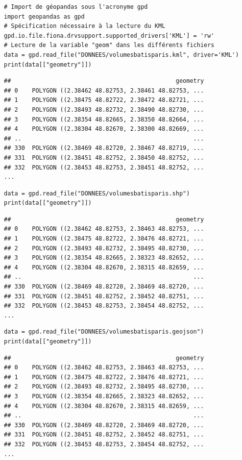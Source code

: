 \documentclass[
  11pt,
  french,
]{article}
\begin{document}
\begin{tcolorbox}[title= Formats KML\, GeoJSON et ShapeFile ,colback=boitecode]
\begin{lstlisting}[style=code]
# Import de géopandas sous l'acronyme gpd
import geopandas as gpd
# Spécification nécessaire à la lecture du KML
gpd.io.file.fiona.drvsupport.supported_drivers['KML'] = 'rw'
# Lecture de la variable "geom" dans les différents fichiers
data = gpd.read_file("DONNEES/volumesbatisparis.kml", driver='KML')
print(data[["geometry"]])\end{lstlisting}
\begin{lstlisting}[style=out]
##                                               geometry
## 0    POLYGON ((2.38462 48.82753, 2.38461 48.82753, ...
## 1    POLYGON ((2.38475 48.82722, 2.38472 48.82721, ...
## 2    POLYGON ((2.38493 48.82732, 2.38490 48.82730, ...
## 3    POLYGON ((2.38354 48.82665, 2.38350 48.82664, ...
## 4    POLYGON ((2.38304 48.82670, 2.38300 48.82669, ...
## ..                                                 ...
## 330  POLYGON ((2.38469 48.82720, 2.38467 48.82719, ...
## 331  POLYGON ((2.38451 48.82752, 2.38450 48.82752, ...
## 332  POLYGON ((2.38453 48.82753, 2.38451 48.82752, ...
...
\end{lstlisting}
\begin{lstlisting}[style=code]
data = gpd.read_file("DONNEES/volumesbatisparis.shp")
print(data[["geometry"]])\end{lstlisting}
\begin{lstlisting}[style=out]
##                                               geometry
## 0    POLYGON ((2.38462 48.82753, 2.38463 48.82753, ...
## 1    POLYGON ((2.38475 48.82722, 2.38476 48.82721, ...
## 2    POLYGON ((2.38493 48.82732, 2.38495 48.82730, ...
## 3    POLYGON ((2.38354 48.82665, 2.38323 48.82652, ...
## 4    POLYGON ((2.38304 48.82670, 2.38315 48.82659, ...
## ..                                                 ...
## 330  POLYGON ((2.38469 48.82720, 2.38469 48.82720, ...
## 331  POLYGON ((2.38451 48.82752, 2.38452 48.82751, ...
## 332  POLYGON ((2.38453 48.82753, 2.38454 48.82752, ...
...
\end{lstlisting}
\begin{lstlisting}[style=code]
data = gpd.read_file("DONNEES/volumesbatisparis.geojson")
print(data[["geometry"]])\end{lstlisting}
\begin{lstlisting}[style=out]
##                                               geometry
## 0    POLYGON ((2.38462 48.82753, 2.38463 48.82753, ...
## 1    POLYGON ((2.38475 48.82722, 2.38476 48.82721, ...
## 2    POLYGON ((2.38493 48.82732, 2.38495 48.82730, ...
## 3    POLYGON ((2.38354 48.82665, 2.38323 48.82652, ...
## 4    POLYGON ((2.38304 48.82670, 2.38315 48.82659, ...
## ..                                                 ...
## 330  POLYGON ((2.38469 48.82720, 2.38469 48.82720, ...
## 331  POLYGON ((2.38451 48.82752, 2.38452 48.82751, ...
## 332  POLYGON ((2.38453 48.82753, 2.38454 48.82752, ...
...
\end{lstlisting}
\end{tcolorbox}
\end{document}
